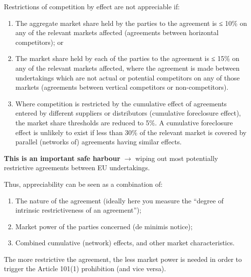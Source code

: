             Restrictions of competition by effect are not appreciable if:
            \begin{enumerate}[label=\alph*.]
                \item The aggregate market share held by the parties to the agreement is ≤ 10\% on any of the relevant markets affected (agreements between horizontal competitors); or
                \item The market share held by each of the parties to the agreement is ≤ 15\% on any of the relevant markets affected, where the agreement is made between undertakings which are not actual or potential competitors on any of those markets (agreements between vertical competitors or non-competitors).
                \item Where competition is restricted by the cumulative effect of agreements entered by different suppliers or distributors (cumulative foreclosure effect), the market share thresholds are reduced to 5\%. A cumulative foreclosure effect is unlikely to exist if less than 30\% of the relevant market is covered by parallel (networks of) agreements having similar effects.
            \end{enumerate}
            
            \textbf{This is an important safe harbour} \(\rightarrow\) wiping out most potentially restrictive agreements between EU undertakings.

            Thus, appreciability can be seen as a combination of:
            \begin{enumerate}[label=\Alph*.]
                \item The nature of the agreement (ideally here you measure the “degree of intrinsic restrictiveness of an agreement”);
                \item Market power of the parties concerned (de minimis notice);
                \item Combined cumulative (network) effects, and other market characteristics.
            \end{enumerate}
            
            The more restrictive the agreement, the less market power is needed in order to trigger the Article 101(1) prohibition (and vice versa).
            
